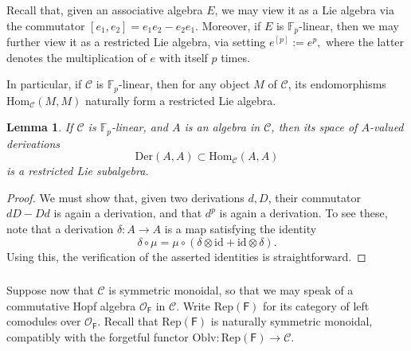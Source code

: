 \documentclass{amsart}
\newtheorem{Lem}[Thm]{Lemma}
\theoremstyle{definition}
\newcommand{\RepF}{\Rep(\mathsf{F})}
\newcommand{\OOF}{\OO_{\mathsf{F}}}
\newcommand{\Rep}{\on{Rep}}
\newcommand{\sC}{\mathscr{C}}
\newcommand{\sss}{\subsubsection{}}
\newcommand{\OO}{\mathscr{O}}
\newcommand{\Hom}{\on{Hom}}
\newcommand{\on}{\mathrm}
\newcommand{\F}{\mathbb{F}}
\numberwithin{equation}{section}
\begin{document}
\sss\label{sss:restrassoc} Recall that, given an associative algebra $E$, we may view it as a Lie algebra via the commutator $[e_1, e_2] = e_1 e_2 - e_2 e_1$. Moreover, if $E$ is $\F_p$-linear, then we may further view it as a restricted Lie algebra, via setting $e^{[p]} := e^p,$ where the latter denotes the multiplication of $e$ with itself $p$ times. 

In particular, if $\sC$ is $\F_p$-linear, then for any object $M$ of $\sC$, its endomorphisms $\Hom_{\sC}(M, M)$  naturally form a restricted Lie algebra. 

\begin{Lem} If $\sC$ is $\F_p$-linear, and $A$ is an algebra in $\sC$, then its {space of} $A$-valued derivations 
$$\on{Der}(A,A) \subset \Hom_{\sC}(A, A)$$
is a restricted Lie subalgebra.     
\end{Lem}

\begin{proof} We must show that, given two derivations $d, D$, their commutator $d D - D d$ is again a derivation, and that $d^p$ is again a derivation. To see these, note that a derivation $\delta: A \rightarrow A$ is a map satisfying the identity 
\begin{equation} \label{e_selfderiv} \delta \circ \mu = \mu \circ (\delta \otimes \on{id} + \on{id} \otimes \delta).\end{equation}
Using this, the verification of the asserted identities is straightforward. 
\end{proof}

\sss\label{SSS_restricted_definition} Suppose now that $\sC$ is symmetric monoidal, so that we may speak of a commutative Hopf algebra $\OOF$ in $\sC$. %
Write $\RepF$ for its category of left comodules over $\OOF$. Recall that $\RepF$ is naturally symmetric monoidal, compatibly with the forgetful functor $\on{Oblv}: \RepF \rightarrow \sC$.
\end{document}
